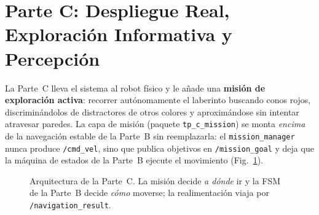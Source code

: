 \section{Parte C: Despliegue Real, Exploración Informativa y Percepción}
\label{sec:parte_c}

La Parte~C lleva el sistema al robot físico y le añade una \textbf{misión de exploración activa}: recorrer autónomamente el laberinto buscando conos rojos, discriminándolos de distractores de otros colores y aproximándose sin intentar atravesar paredes. La capa de misión (paquete \texttt{tp\_c\_mission}) se monta \emph{encima} de la navegación estable de la Parte~B sin reemplazarla: el \texttt{mission\_manager} nunca produce \texttt{/cmd\_vel}, sino que publica objetivos en \texttt{/mission\_goal} y deja que la máquina de estados de la Parte~B ejecute el movimiento (Fig.~\ref{fig:c_arch}).

\begin{figure}[t]
\centering
{}
\caption{Arquitectura de la Parte~C. La misión decide \emph{a dónde} ir y la FSM de la Parte~B decide \emph{cómo} moverse; la realimentación viaja por \texttt{/navigation\_result}.}
\label{fig:c_arch}
\end{figure}


